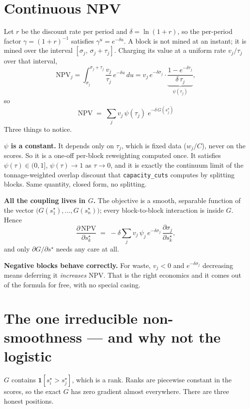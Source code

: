 \documentclass[11pt,a4paper]{article}
\newcommand{\ind}[1]{\mathbf{1}\!\left[#1\right]}
\newcommand{\sstar}{s^{\star}}
\theoremstyle{definition}
\begin{document}
\section{Continuous NPV}

Let $r$ be the discount rate per period and $\delta = \ln(1+r)$, so the per-period factor
$\gamma = (1+r)^{-1}$ satisfies $\gamma^{u} = e^{-\delta u}$. A block is not mined at an instant;
it is mined over the interval $[\sigma_j,\, \sigma_j + \tau_j]$. Charging its value at a uniform
rate $v_j/\tau_j$ over that interval,
\[
  \mathrm{NPV}_j
  = \int_{\sigma_j}^{\sigma_j+\tau_j} \frac{v_j}{\tau_j}\, e^{-\delta u}\, du
  = v_j\, e^{-\delta \sigma_j} \cdot \underbrace{\frac{1-e^{-\delta \tau_j}}{\delta\,\tau_j}}_{\displaystyle \psi(\tau_j)} ,
\]
so
\[
  \boxed{\;
  \mathrm{NPV} \;=\; \sum_j v_j\, \psi(\tau_j)\; e^{-\delta\, G(\sstar_j)}
  \;}
\]
Three things to notice.

\medskip
\noindent\textbf{$\psi$ is a constant.} It depends only on $\tau_j$, which is fixed data
($w_j/C$), never on the scores. So it is a one-off per-block reweighting computed once. It
satisfies $\psi(\tau)\in(0,1]$, $\psi(\tau) \to 1$ as $\tau \to 0$, and it is exactly the
continuum limit of the tonnage-weighted overlap discount that \texttt{capacity\_cuts} computes by
splitting blocks. Same quantity, closed form, no splitting.

\medskip
\noindent\textbf{All the coupling lives in $G$.} The objective is a smooth, separable function of
the vector $\big(G(\sstar_1),\dots,G(\sstar_n)\big)$; every block-to-block interaction is inside
$G$. Hence
\[
  \frac{\partial\, \mathrm{NPV}}{\partial \sstar_k}
  \;=\; -\delta \sum_j v_j\, \psi_j\, e^{-\delta \sigma_j}\, \frac{\partial \sigma_j}{\partial \sstar_k},
\]
and only $\partial G/\partial \sstar$ needs any care at all.

\medskip
\noindent\textbf{Negative blocks behave correctly.} For waste, $v_j<0$ and $e^{-\delta\sigma_j}$
decreasing means deferring it \emph{increases} NPV. That is the right economics and it comes out
of the formula for free, with no special casing.

\section{The one irreducible non-smoothness --- and why not the logistic}

$G$ contains $\ind{\sstar_i > \sstar_j}$, which is a rank. Ranks are piecewise constant in the
scores, so the exact $G$ has zero gradient almost everywhere. There are three honest positions.
\end{document}
